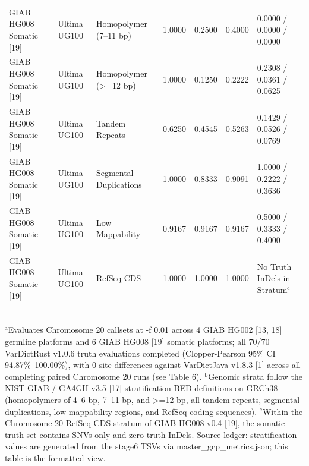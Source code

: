 \begin{table}[htbp]
{\begin{tabular}{lllllll}
GIAB HG008 Somatic [19] & Ultima UG100 & Homopolymer (7--11 bp) & 1.0000 & 0.2500 & 0.4000 & 0.0000 / 0.0000 / 0.0000 \\
GIAB HG008 Somatic [19] & Ultima UG100 & Homopolymer (\textgreater{}=12 bp) & 1.0000 & 0.1250 & 0.2222 & 0.2308 / 0.0361 / 0.0625 \\
GIAB HG008 Somatic [19] & Ultima UG100 & Tandem Repeats & 0.6250 & 0.4545 & 0.5263 & 0.1429 / 0.0526 / 0.0769 \\
GIAB HG008 Somatic [19] & Ultima UG100 & Segmental Duplications & 1.0000 & 0.8333 & 0.9091 & 1.0000 / 0.2222 / 0.3636 \\
GIAB HG008 Somatic [19] & Ultima UG100 & Low Mappability & 0.9167 & 0.9167 & 0.9167 & 0.5000 / 0.3333 / 0.4000 \\
GIAB HG008 Somatic [19] & Ultima UG100 & RefSeq CDS & 1.0000 & 1.0000 & 1.0000 & No Truth InDels in Stratum$^{\text{c}}$ \\
\hline
\end{tabular}%
}
\\[4pt]\footnotesize{$^{\text{a}}$Evaluates Chromosome 20 callsets at -f 0.01 across 4 GIAB HG002 [13, 18] germline platforms and 6 GIAB HG008 [19] somatic platforms; all 70/70 VarDictRust v1.0.6 truth evaluations completed (Clopper-Pearson 95\% CI 94.87\%--100.00\%), with 0 site differences against VarDictJava v1.8.3 [1] across all completing paired Chromosome 20 runs (see Table 6). $^{\text{b}}$Genomic strata follow the NIST GIAB / GA4GH v3.5 [17] stratification BED definitions on GRCh38 (homopolymers of 4--6 bp, 7--11 bp, and \textgreater{}=12 bp, all tandem repeats, segmental duplications, low-mappability regions, and RefSeq coding sequences). $^{\text{c}}$Within the Chromosome 20 RefSeq CDS stratum of GIAB HG008 v0.4 [19], the somatic truth set contains SNVs only and zero truth InDels. Source ledger: stratification values are generated from the stage6 TSVs via master\_gcp\_metrics.json; this table is the formatted view.}
\end{table}

